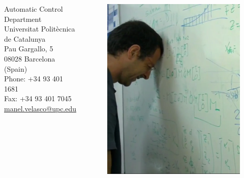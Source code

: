 \documentclass[9pt,colorlinks]{beamer}
\begin{document}
\begin{frame}[plain]
\begin{columns}[c]
Automatic Control Department\\
Universitat Politècnica de Catalunya\\
Pau Gargallo, 5\\
08028 Barcelona (Spain)\\
Phone: +34 93 401 1681\\
Fax: +34 93 401 7045\\
\href{manel.velasco@upc.edu}{manel.velasco@upc.edu}
\begin{figure}[!htb]
    \centering
    \includegraphics[width=\textwidth]{figs/manel}
\end{figure}
\end{columns}
\end{frame}
\end{document}
